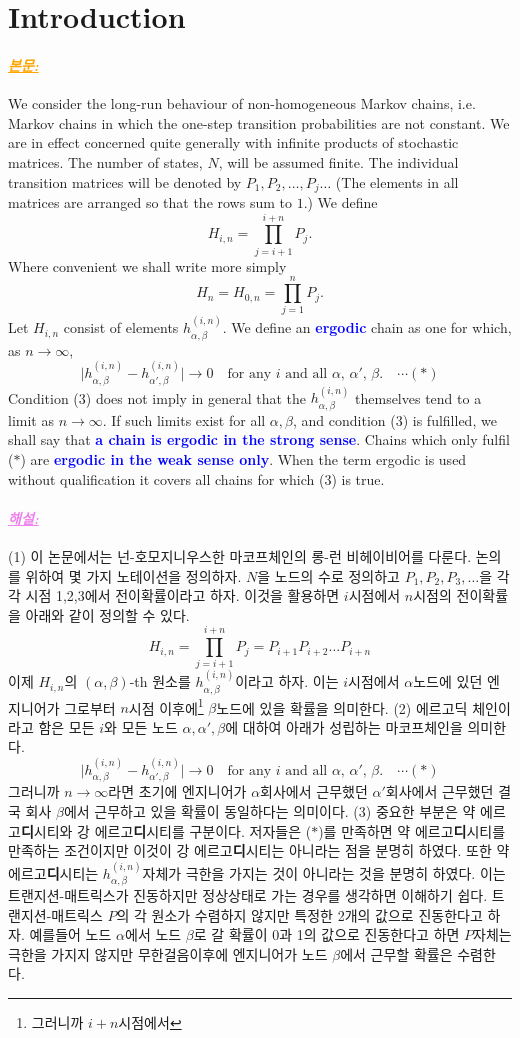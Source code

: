 \documentclass[12pt,oneside,english,a4paper]{article}
\newcommand{\paraviolet}[1]{\paragraph{\LARGE\textcolor{violet}{\it\underline{\textbf{#1:}}}}\LARGE}
\newcommand{\paraorange}[1]{\paragraph{\LARGE\textcolor{orange}{\it\underline{\textbf{#1:}}}}\LARGE}
\begin{document}
\section{Introduction}
\paraorange{본문} We consider the long-run behaviour of non-homogeneous Markov
chains, i.e. Markov chains in which the one-step transition probabilities are not constant. We are in effect concerned quite generally with infinite products of stochastic matrices. The number of states, $N$, will be assumed finite. The individual transition matrices will be denoted by $P_1,P_2,\dots,P_j\dots$ (The elements in all matrices are arranged so that the rows sum to $1$.) We define
\[
H_{i,n}=\prod_{j=i+1}^{i+n}P_j.
\]
Where convenient we shall write more simply
\[
H_n=H_{0,n}=\prod_{j=1}^{n}P_j.
\]
Let $H_{i,n}$ consist of elements $h_{\alpha,\beta}^{(i,n)}$. We define an \textcolor{blue}{\bf ergodic} chain as one for which, as $n\to \infty$,
\[
\big|h_{\alpha,\beta}^{(i,n)}-h_{\alpha',\beta}^{(i,n)} \big|\to 0 \quad \mbox{for any $i$ and all $\alpha$, $\alpha'$, $\beta$.} \quad \cdots (\ast)
\]
Condition (3) does not imply in general that the $h_{\alpha,\beta}^{(i,n)}$ themselves tend to a limit as $n \to \infty$. If such limits exist for all $\alpha,\beta$, and condition (3) is fulfilled, we shall say that \textcolor{blue}{\bf a chain is ergodic in the strong sense}. Chains which only fulfil ($\ast$) are \textcolor{blue}{\bf ergodic in the weak sense only}. When the term ergodic is used without qualification it covers all chains for which (3) is true.

\paraviolet{해설} (1) 이 논문에서는 넌-호모지니우스한 마코프체인의 롱-런 비헤이비어를 다룬다. 논의를 위하여 몇 가지 노테이션을 정의하자. $N$을 노드의 수로 정의하고 $P_1,P_2,P_3,\dots$을 각각 시점 1,2,3에서 전이확률이라고 하자. 이것을 활용하면 $i$시점에서 $n$시점의 전이확률을 아래와 같이 정의할 수 있다. 
\[
H_{i,n}=\prod_{j=i+1}^{i+n}P_j=P_{i+1}P_{i+2}\dots P_{i+n}
\]
이제 $H_{i,n}$의 $(\alpha,\beta)$-th 원소를 $h_{\alpha,\beta}^{(i,n)}$이라고 하자. 이는 $i$시점에서 $\alpha$노드에 있던 엔지니어가 그로부터 $n$시점 이후에\footnote{그러니까 $i+n$시점에서} $\beta$노드에 있을 확률을 의미한다. (2) 에르고딕 체인이라고 함은 모든 $i$와 모든 노드 $\alpha,\alpha',\beta$에 대하여 아래가 성립하는 마코프체인을 의미한다. 
\[
\big|h_{\alpha,\beta}^{(i,n)}-h_{\alpha',\beta}^{(i,n)} \big|\to 0 \quad \mbox{for any $i$ and all $\alpha$, $\alpha'$, $\beta$.} \quad \cdots(\ast)
\]
그러니까 $n\to \infty$라면 초기에 엔지니어가 $\alpha$회사에서 근무했던 $\alpha'$회사에서 근무했던 결국 회사 $\beta$에서 근무하고 있을 확률이 동일하다는 의미이다. (3) 중요한 부분은 약 에르고{\bf 디}시티와 강 에르고{\bf 디}시티를 구분이다. 저자들은 ($\ast$)를 만족하면 약 에르고{\bf 디}시티를 만족하는 조건이지만 이것이 강 에르고{\bf 디}시티는 아니라는 점을 분명히 하였다. 또한 약 에르고{\bf 디}시티는 $h_{\alpha,\beta}^{(i,n)}$자체가 극한을 가지는 것이 아니라는 것을 분명히 하였다. 이는 트랜지션-매트릭스가 진동하지만 정상상태로 가는 경우를 생각하면 이해하기 쉽다. 트랜지션-매트릭스 $P$의 각 원소가 수렴하지 않지만 특정한 2개의 값으로 진동한다고 하자. 예를들어 노드 $\alpha$에서 노드 $\beta$로 갈 확률이 0과 1의 값으로 진동한다고 하면 $P$자체는 극한을 가지지 않지만 무한걸음이후에 엔지니어가 노드 $\beta$에서 근무할 확률은 수렴한다. 
\end{document}

